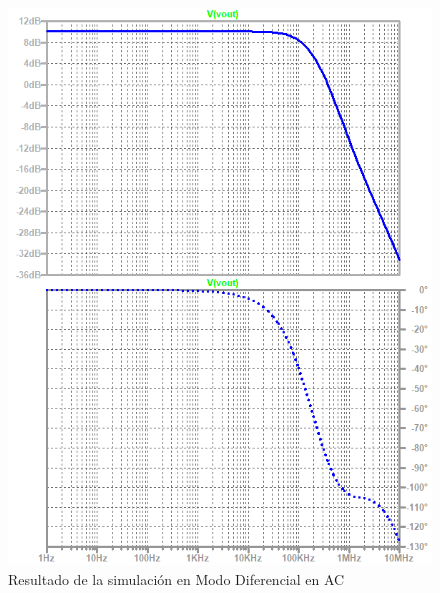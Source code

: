 \begin{figure}[ht]
\begin{center}
\includegraphics[scale=1]{res/spice/spice_dm_ac_bode.png}
\caption{Resultado de la simulación en Modo Diferencial en AC}
\label{e4:fig_spice_dm_ac_res}
\end{center}
\end{figure}

